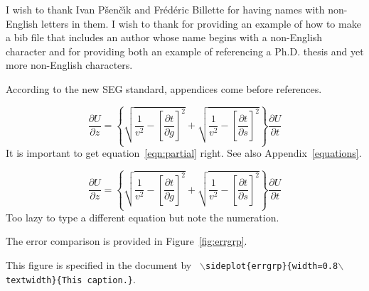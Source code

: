 \documentclass[paper,revised]{geophysics}
\begin{document}
\begin{acknowledgments}
I wish to thank Ivan P\v{s}en\v{c}\'{\i}k and Fr\'ed\'eric Billette
for having names with non-English letters in them.  I wish to thank
\cite{Cerveny} for providing an example of how to make a bib file that
includes an author whose name begins with a non-English character and
\cite{forgues96} for providing both an example of referencing a Ph.D.
thesis and yet more non-English characters.
\end{acknowledgments}

\label{example}

According to the new SEG standard, appendices come before references.

\begin{equation}
\frac{\partial U}{\partial z} = 
\left\{
  \sqrt{\frac{1}{v^2} - \left[\frac{\partial t}{\partial g}\right]^2} +
  \sqrt{\frac{1}{v^2} - \left[\frac{\partial t}{\partial s}\right]^2}
\right\}
\frac{\partial U}{\partial t}
\label{eqn:partial}
\end{equation}
It is important to get equation~\ref{eqn:partial} right. See also
Appendix~\ref{equations}.


\begin{equation}
\frac{\partial U}{\partial z} = 
\left\{
  \sqrt{\frac{1}{v^2} - \left[\frac{\partial t}{\partial g}\right]^2} +
  \sqrt{\frac{1}{v^2} - \left[\frac{\partial t}{\partial s}\right]^2}
\right\}
\frac{\partial U}{\partial t}
\label{eqn:partial2}
\end{equation}
Too lazy to type a different equation but note the numeration.

The error comparison is provided in Figure~\ref{fig:errgrp}.

{This figure is specified in the document by \texttt{
    $\backslash$sideplot\{errgrp\}\{width=0.8$\backslash$text\-width\}\{This caption.\}}.
}







\newpage


\end{document}
